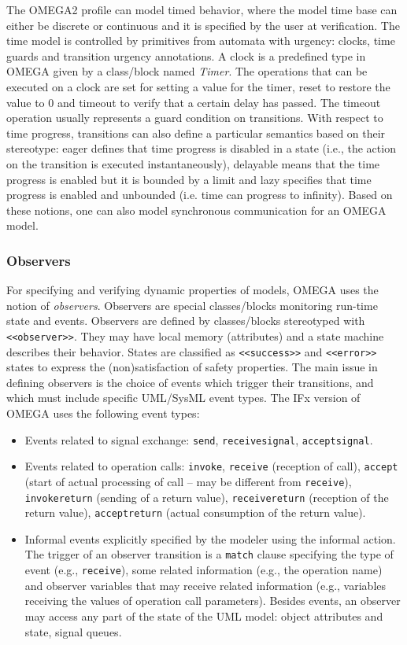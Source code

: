 \documentclass[a4paper,twoside]{article}
\begin{document}
The OMEGA2 profile can model timed behavior, where the model time base can either be discrete or continuous and it is specified by the user at verification. The time model is controlled by primitives from automata with urgency: clocks, time guards and transition urgency annotations. A clock is a predefined type in OMEGA given by a class/block named \textit{Timer}. The operations that can be executed on a clock are set for setting a value for the timer, reset to restore the value to 0 and timeout to verify that a certain delay has passed. The timeout operation usually represents a guard condition on transitions. With respect to time progress, transitions can also define a particular semantics based on their stereotype: eager defines that time progress is disabled in a state (i.e., the action on the transition is executed instantaneously), delayable means that the time progress is enabled but it is bounded by a limit and lazy specifies that time progress is enabled and unbounded (i.e. time can progress to infinity). Based on these notions, one can also model synchronous communication for an OMEGA model.

\subsubsection{Observers}

For specifying and verifying dynamic properties of models, OMEGA uses the notion of \textit{observers}.
Observers are special classes/blocks monitoring run-time state and events. Observers are defined by classes/blocks stereotyped with \texttt{<<observer>>}. They may have local memory (attributes) and a state machine describes their behavior. States are classified as \texttt{<<success>>} and \texttt{<<error>>} states to express the (non)satisfaction of safety properties. The main issue in defining observers is the choice of events which trigger their transitions, and which must include specific UML/SysML event types. The IFx version of OMEGA uses the following event types:
\begin{itemize}
\item Events related to signal exchange: \texttt{send}, \texttt{receivesignal}, \texttt{acceptsignal}.
\item Events related to operation calls: \texttt{invoke}, \texttt{receive} (reception of call), \texttt{accept} (start of actual processing of call -- may be different from \texttt{receive}), \texttt{invokereturn} (sending of a 
return 	value), \texttt{receivereturn} (reception of the return value), \texttt{acceptreturn} (actual consumption	of the return value).
\item Informal events explicitly specified by the modeler using the informal action.
The trigger of an observer transition is a \texttt{match} clause specifying the type of event (e.g., \texttt{receive}), some related information (e.g., the operation name) and observer variables that may receive related information (e.g., variables receiving the values of operation call parameters). Besides events, an observer may access any part of the state of the UML model: object attributes and state, signal queues. 
\end{itemize}
\end{document}
